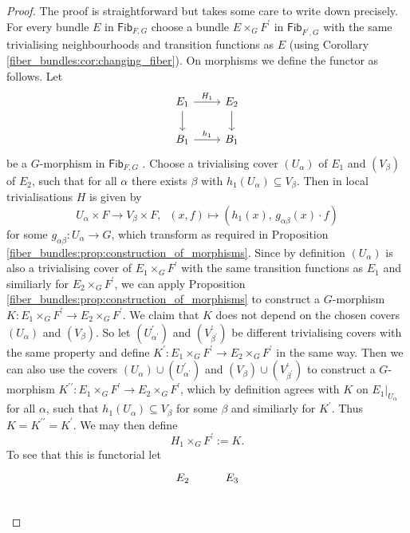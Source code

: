     \begin{proof}
    The proof is straightforward but takes some care to write down precisely. For every bundle $E$ in $\mathsf{Fib}_{F,G}$ choose a bundle $E \times_G F^\prime$ in $\mathsf{Fib}_{F^\prime,G}$ with the same trivialising neighbourhoods and transition functions as $E$ (using Corollary \ref{fiber_bundles:cor:changing_fiber}). On morphisms we define the functor as follows. Let 
    \[\begin{tikzcd}
        E_1 & {E_2} \\
        B_1 & {B_1}
        \arrow["H_1", from=1-1, to=1-2]
        \arrow[from=1-1, to=2-1]
        \arrow[from=1-2, to=2-2]
        \arrow["h_1", from=2-1, to=2-2]
        \end{tikzcd}\]
    be a $G$-morphism in $\mathsf{Fib}_{F,G}$ . Choose a trivialising cover $(U_\alpha)$ of $E_1$ and $(V_\beta)$ of $E_2$, such that for all $\alpha$ there exists $\beta$ with $h_1(U_\alpha) \subseteq V_\beta$. Then in local trivialisations $H$ is given by 
    \[
        U_\alpha \times F \to V_\beta \times F, \; \; (x,f) \mapsto (h_1(x), \, g_{\alpha\beta}(x) \cdot f)
    \]
    for some $g_{\alpha\beta} \colon U_\alpha \to G$, which transform as required in Proposition \ref{fiber_bundles:prop:construction_of_morphisms}. Since by definition $(U_\alpha)$ is also a trivialising cover of $E_1 \times_G F^\prime$ with the same transition functions as $E_1$ and similiarly for $E_2 \times_G F^\prime$, we can apply Proposition \ref{fiber_bundles:prop:construction_of_morphisms} to construct a $G$-morphism $K \colon E_1 \times_G F^\prime \to E_2 \times_G F^\prime$. We claim that $K$ does not depend on the chosen covers $(U_\alpha)$ and $(V_\beta)$. So let $(U^\prime_{\alpha^\prime})$ and $(V^\prime_{\beta^\prime})$ be different trivialising covers with the same property and define $K^\prime \colon E_1 \times_G F^\prime \to E_2 \times_G F^\prime$ in the same way. Then we can also use the covers $(U_\alpha) \cup (U^\prime_{\alpha^\prime})$ and $(V_\beta) \cup (V^\prime_{\beta^\prime})$ to construct a $G$-morphism $K^{\prime\prime} \colon E_1 \times_G F^\prime \to E_2 \times_G F^\prime$, which by definition agrees with $K$ on $E_1|_{U_\alpha}$ for all $\alpha$, such that $h_1(U_\alpha) \subseteq V_\beta$ for some $\beta$ and similiarly for $K^\prime$. Thus $K = K^{\prime\prime} = K^\prime$. We may then define 
    \[
    H_1 \times_G F^\prime := K.
    \]
    To see that this is functorial let 
    \[\begin{tikzcd}
        E_2 & {E_3} \\

\end{tikzcd}\]
\end{proof}
